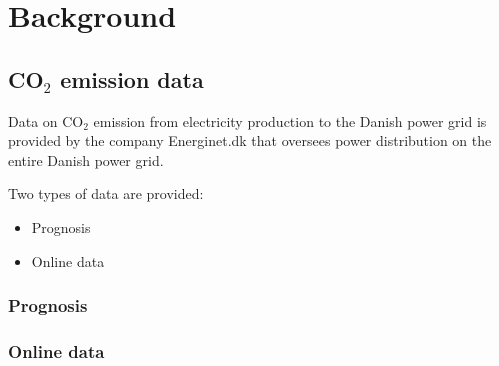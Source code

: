 \documentclass[Main]{subfiles}
\begin{document}
\section{Background} %
\label{sec:background}

	\subsection{CO$_2$ emission data} %
	\label{sub:c02_emission_data}

		Data on CO$_2$ emission from electricity production to the Danish power grid is provided by the company Energinet.dk that oversees power distribution on the entire Danish power grid.

		Two types of data are provided:
		\begin{itemize}
			\item Prognosis
			\item Online data
		\end{itemize}

		\subsubsection{Prognosis} %
		\label{sub:prognosis}
			

			

		\subsubsection{Online data} %
		\label{sub:online_data}
		



\end{document}
